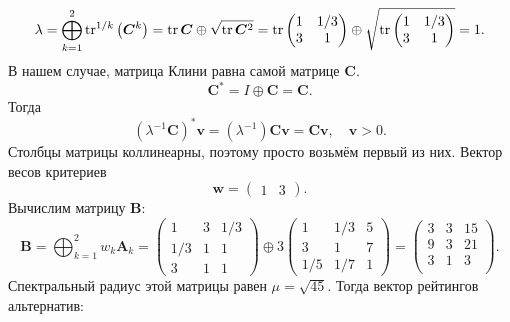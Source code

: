\documentclass[specialist,
	substylefile = spbu_report.rtx,
	subf,href,colorlinks=true, 12pt]{disser}
\begin{document}
\[
	\lambda=\bigoplus_{k=1}^{2} \operatorname{tr}^{1 / k}\left(\boldsymbol{C}^{k}\right) = \operatorname{tr}\boldsymbol{C} \oplus \sqrt{\operatorname{tr}\boldsymbol{C}^2} =
	\operatorname{tr}\begin{pmatrix}1&1/3\\3&1\end{pmatrix} \oplus \sqrt{\operatorname{tr}\begin{pmatrix}1&1/3\\3&1\end{pmatrix}} = 1.
\]
В нашем случае, матрица Клини равна самой матрице \(\boldsymbol{C}\).
\[
	\boldsymbol{C}^* = I \oplus \boldsymbol{C} = \boldsymbol{C}.
\]
Тогда
\[
	(\lambda^{-1}\boldsymbol{C})^*\boldsymbol{v} = (\lambda^{-1})\boldsymbol{C}\boldsymbol{v} = \boldsymbol{C}\boldsymbol{v}, \quad \boldsymbol{v} > 0.
\]
Столбцы матрицы коллинеарны, поэтому просто возьмём первый из них. Вектор весов критериев
\[
	\boldsymbol{w} = \begin{pmatrix}1 & 3\end{pmatrix}.
\]
Вычислим матрицу \(\boldsymbol{B}\):
\[
	\boldsymbol{B}=\bigoplus_{k=1}^{2} w_{k} \boldsymbol{A}_{k} = \begin{pmatrix}1&3&1/3\\1/3&1&1\\3&1&1\end{pmatrix} \oplus 3\begin{pmatrix}1&1/3&5\\3&1&7\\1/5&1/7&1\end{pmatrix} = \begin{pmatrix}3&3&15\\ 9&3&21\\ 3&1&3\\\end{pmatrix}.
\]
Спектральный радиус этой матрицы равен \(\mu = \sqrt{45}\).
Тогда вектор рейтингов альтернатив:
\end{document}
